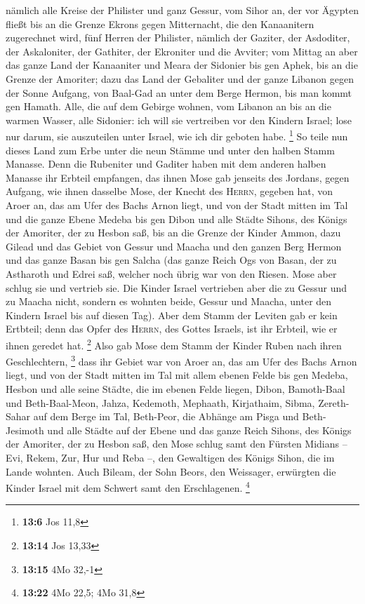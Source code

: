  nämlich alle Kreise der Philister und ganz Gessur,
 vom Sihor an, der vor Ägypten fließt bis an die Grenze
Ekrons gegen Mitternacht, die den Kanaanitern zugerechnet wird, fünf
Herren der Philister, nämlich der Gaziter, der Asdoditer, der
Askaloniter, der Gathiter, der Ekroniter und die Avviter; 
vom Mittag an aber das ganze Land der Kanaaniter und Meara der Sidonier
bis gen Aphek, bis an die Grenze der Amoriter;  dazu das
Land der Gebaliter und der ganze Libanon gegen der Sonne Aufgang, von
Baal-Gad an unter dem Berge Hermon, bis man kommt gen Hamath.
 Alle, die auf dem Gebirge wohnen, vom Libanon an bis an
die warmen Wasser, alle Sidonier: ich will sie vertreiben vor den
Kindern Israel; lose nur darum, sie auszuteilen unter Israel, wie ich
dir geboten habe. \footnote{\textbf{13:6} Jos 11,8}  So
teile nun dieses Land zum Erbe unter die neun Stämme und unter den
halben Stamm Manasse.  Denn die Rubeniter und Gaditer
haben mit dem anderen halben Manasse ihr Erbteil empfangen, das ihnen
Mose gab jenseits des Jordans, gegen Aufgang, wie ihnen dasselbe Mose,
der Knecht des \textsc{Herrn}, gegeben hat,  von Aroer an,
das am Ufer des Bachs Arnon liegt, und von der Stadt mitten im Tal und
die ganze Ebene Medeba bis gen Dibon  und alle Städte
Sihons, des Königs der Amoriter, der zu Hesbon saß, bis an die Grenze
der Kinder Ammon,  dazu Gilead und das Gebiet von Gessur
und Maacha und den ganzen Berg Hermon und das ganze Basan bis gen Salcha
 (das ganze Reich Ogs von Basan, der zu Astharoth und
Edrei saß, welcher noch übrig war von den Riesen. Mose aber schlug sie
und vertrieb sie.  Die Kinder Israel vertrieben aber die
zu Gessur und zu Maacha nicht, sondern es wohnten beide, Gessur und
Maacha, unter den Kindern Israel bis auf diesen Tag). 
Aber dem Stamm der Leviten gab er kein Ertbteil; denn das Opfer des
\textsc{Herrn}, des Gottes Israels, ist ihr Erbteil, wie er ihnen
geredet hat. \footnote{\textbf{13:14} Jos 13,33}  Also
gab Mose dem Stamm der Kinder Ruben nach ihren Geschlechtern,
\footnote{\textbf{13:15} 4Mo 32,-1}  dass ihr Gebiet war
von Aroer an, das am Ufer des Bachs Arnon liegt, und von der Stadt
mitten im Tal mit allem ebenen Felde bis gen Medeba, 
Hesbon und alle seine Städte, die im ebenen Felde liegen, Dibon,
Bamoth-Baal und Beth-Baal-Meon,  Jahza, Kedemoth,
Mephaath,  Kirjathaim, Sibma, Zereth-Sahar auf dem Berge
im Tal,  Beth-Peor, die Abhänge am Pisga und
Beth-Jesimoth  und alle Städte auf der Ebene und das
ganze Reich Sihons, des Königs der Amoriter, der zu Hesbon saß, den Mose
schlug samt den Fürsten Midians -- Evi, Rekem, Zur, Hur und Reba --, den
Gewaltigen des Königs Sihon, die im Lande wohnten.  Auch
Bileam, der Sohn Beors, den Weissager, erwürgten die Kinder Israel mit
dem Schwert samt den Erschlagenen. \footnote{\textbf{13:22} 4Mo 22,5;
  4Mo 31,8}

